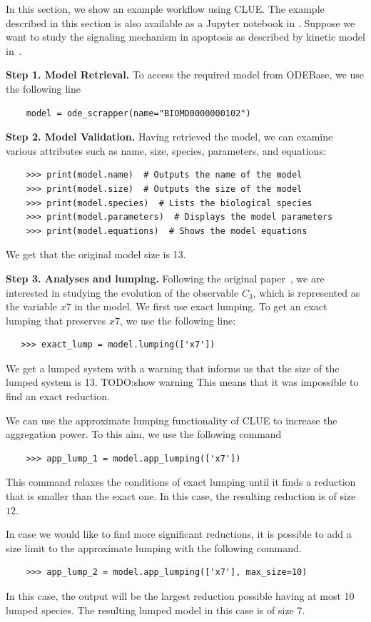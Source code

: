 In this section, we show an example workflow using CLUE.
The example described in this section is also available as a Jupyter notebook in \RepoURL.
Suppose we want to study the signaling mechanism in apoptosis as described by kinetic model in~\cite{legewie_mathematical_2006}.

\textbf{Step 1. Model Retrieval.}
To access the required model from ODEBase, we use the following line
\begin{verbatim}
    model = ode_scrapper(name="BIOMD0000000102")
\end{verbatim}

\textbf{Step 2. Model Validation.}
Having retrieved the model, we can examine various attributes such as name, size, species, parameters, and equations:
\begin{verbatim}
    >>> print(model.name)  # Outputs the name of the model
    >>> print(model.size)  # Outputs the size of the model
    >>> print(model.species)  # Lists the biological species
    >>> print(model.parameters)  # Displays the model parameters 
    >>> print(model.equations)  # Shows the model equations
\end{verbatim}
We get that the original model size is 13.

\textbf{Step 3. Analyses and lumping.}
Following the original paper~\cite{legewie_mathematical_2006}, we are interested in studying the evolution of the observable $C_3$, which is represented as the variable $x7$ in the model.
We first use exact lumping.
To get an exact lumping that preserves $x7$, we use the following line:
\begin{verbatim}
   >>> exact_lump = model.lumping(['x7'])
\end{verbatim}
We get a lumped system with a warning that informs us that the size of the lumped system is 13.
TODO:show warning
This means that it was impossible to find an exact reduction.

We can use the approximate lumping functionality of CLUE to increase the aggregation power. 
To this aim, we use the following command 
\begin{verbatim}
    >>> app_lump_1 = model.app_lumping(['x7'])
\end{verbatim}
This command relaxes the conditions of exact lumping until it finds a reduction that is smaller than the exact one. 
In this case, the resulting reduction is of size $12$. 

In case we would like to find more significant reductions, it is possible to add a size limit to the approximate lumping with the following command.
\begin{verbatim}
    >>> app_lump_2 = model.app_lumping(['x7'], max_size=10)
\end{verbatim}
In this case, the output will be the largest reduction possible having at most 10 lumped species.
The resulting lumped model in this case is of size 7.

